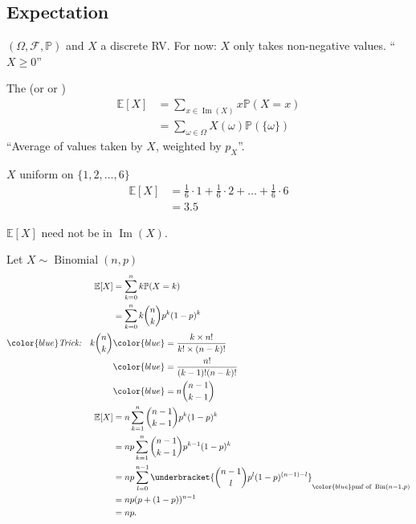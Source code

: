 \subsection{Expectation}
$(\Omega, \mathcal{F}, \mathbb{P})$ and $X$ a discrete RV.
For now: $X$ only takes non-negative values. ``$X \geq 0$''

\begin{definition}[Expectation]
    The  (or  or )
    \begin{align*}
        \mathbb{E}[X] &= \sum_{x \in \operatorname{Im}(X)} x \mathbb{P}(X = x) \\
        &= \sum_{\omega \in \Omega} X(\omega) \mathbb{P}(\{\omega\}) 
    \end{align*} 
    \color{blue} ``Average of values taken by $X$, weighted by $p_X$''.
\end{definition} 

\begin{example}
    $X$ uniform on $\{1, 2, \dots, 6\}$
    \begin{align*}
        \mathbb{E}[X] &= \frac{1}{6} \cdot 1 + \frac{1}{6} \cdot 2 + \dots + \frac{1}{6} \cdot 6 \\
        &= 3.5 
    \end{align*} 
\end{example} 

\begin{note}
    $\mathbb{E}[X]$ need not be in $\operatorname{Im}(X)$.
\end{note}

\begin{example}
    Let $X \sim \operatorname{Binomial}(n, p)$
    \begin{align*}
        \mathbb{E}[X] &= \sum_{k=0}^{n} k \mathbb{P}(X = k) \\
        &= \sum_{k=0}^{n} k \binom{n}{k} p^k (1 - p)^k \\
        \color{blue} \emph{Trick:} \quad k \binom{n}{k} &\color{blue}=  \frac{k \times n!}{k! \times (n - k)!} \\
        &\color{blue}= \frac{n!}{(k - 1)! (n - k)!} \\
        &\color{blue}= n \binom{n - 1}{k - 1} \\
        \mathbb{E}[X] &= n \sum_{k=1}^{n} \binom{n - 1}{k - 1} p^k (1 - p)^k \\
        &= n p \sum_{k=1}^{n} \binom{n - 1}{k - 1} p^{k - 1} (1 - p)^k \\
        &= np \sum_{l=0}^{n - 1} \underbracket{\binom{n - 1}{l} p^l (1 - p)^{(n - 1) - l}}_{\color{blue} \text{pmf of } \operatorname{Bin}(n - 1, p)} \\
        &= np (p + (1 - p))^{n - 1} \\
        &= np.
    \end{align*} 
\end{example} 

